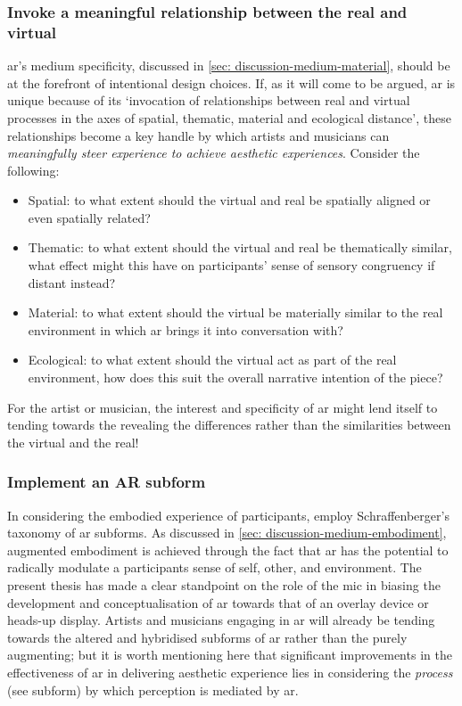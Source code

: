 \subsubsection{Invoke a meaningful relationship between the real and virtual}
\gls{ar}'s medium specificity, discussed in \autoref{sec: discussion-medium-material}, should be at the forefront of intentional design choices. If, as it will come to be argued, \gls{ar} is unique because of its `invocation of relationships between real and virtual processes in the axes of spatial, thematic, material and ecological distance', these relationships become a key handle by which artists and musicians can \textit{meaningfully steer experience to achieve aesthetic experiences}. Consider the following:
\begin{itemize}
    \item Spatial: to what extent should the virtual and real be spatially aligned or even spatially related?
    \item Thematic: to what extent should the virtual and real be thematically similar, what effect might this have on participants' sense of sensory congruency if distant instead?
    \item Material: to what extent should the virtual be materially similar to the real environment in which \gls{ar} brings it into conversation with? 
    \item Ecological: to what extent should the virtual act as part of the real environment, how does this suit the overall narrative intention of the piece?
\end{itemize}
For the artist or musician, the interest and specificity of \gls{ar} might lend itself to tending towards the revealing the differences rather than the similarities between the virtual and the real!

\subsubsection{Implement an AR subform}
In considering the embodied experience of participants, employ Schraffenberger's taxonomy of \gls{ar} subforms. As discussed in \autoref{sec: discussion-medium-embodiment}, augmented embodiment is achieved through the fact that \gls{ar} has the potential to radically modulate a participants sense of self, other, and environment. The present thesis has made a clear standpoint on the role of the \gls{mic} in biasing the development and conceptualisation of \gls{ar} towards that of an overlay device or heads-up display. Artists and musicians engaging in \gls{ar} will already be tending towards the altered and hybridised subforms of \gls{ar} rather than the purely augmenting; but it is worth mentioning here that significant improvements in the effectiveness of \gls{ar} in delivering aesthetic experience lies in considering the \textit{process} (see subform) by which perception is mediated by \gls{ar}.

